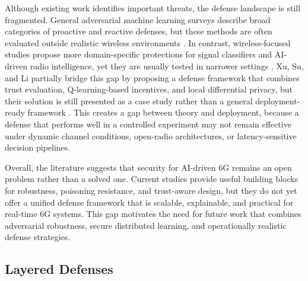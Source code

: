 \documentclass[letterpaper]{article} %
\begin{document}
Although existing work identifies important threats, the defense landscape is still fragmented. General adversarial machine learning surveys describe broad categories of proactive and reactive defenses, but these methods are often evaluated outside realistic wireless environments \cite{bountakas2023defense}. In contrast, wireless-focused studies propose more domain-specific protections for signal classifiers and AI-driven radio intelligence, yet they are usually tested in narrower settings \cite{ahmed2023cdi,chiejina2024oran}. Xu, Su, and Li partially bridge this gap by proposing a defense framework that combines trust evaluation, Q-learning-based incentives, and local differential privacy, but their solution is still presented as a case study rather than a general deployment-ready framework \cite{xu2022security}. This creates a gap between theory and deployment, because a defense that performs well in a controlled experiment may not remain effective under dynamic channel conditions, open-radio architectures, or latency-sensitive decision pipelines.

Overall, the literature suggests that security for AI-driven 6G remains an open problem rather than a solved one. Current studies provide useful building blocks for robustness, poisoning resistance, and trust-aware design, but they do not yet offer a unified defense framework that is scalable, explainable, and practical for real-time 6G systems. This gap motivates the need for future work that combines adversarial robustness, secure distributed learning, and operationally realistic defense strategies.


\subsection{Layered Defenses}
\end{document}
